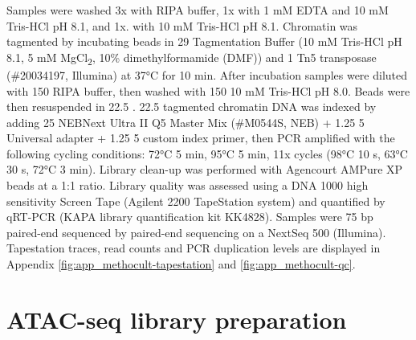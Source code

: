 Samples were washed 3x with RIPA buffer, 1x with 1 mM EDTA and 10 mM Tris-HCl pH 8.1, and 1x. with 10 mM Tris-HCl pH 8.1. Chromatin was tagmented by incubating beads in 29 \microl{} Tagmentation Buffer (10 mM Tris-HCl pH 8.1, 5 mM MgCl\textsubscript{2}, 10\% dimethylformamide (DMF)) and 1 \microl{} Tn5 transposase (\#20034197, Illumina) at 37°C for 10 min. After incubation samples were diluted with 150 \microl{} RIPA buffer, then washed with 150 \microl{} 10 mM Tris-HCl pH 8.0. Beads were then resuspended in 22.5 \microl{} \water{}. 22.5 \microl{} tagmented chromatin DNA was indexed by adding 25 \microl{} NEBNext Ultra II Q5 Master Mix (\#M0544S, NEB) + 1.25 \microl{} 5 \microm{} Universal adapter + 1.25 \microl{} 5 \microm{} custom index primer, then PCR amplified with the following cycling conditions: 72°C 5 min, 95°C 5 min, 11x cycles (98°C 10 s, 63°C 30 s, 72°C 3 min). Library clean-up was performed with Agencourt AMPure XP beads at a 1:1 ratio. Library quality was assessed using a DNA 1000 high sensitivity Screen Tape (Agilent 2200 TapeStation system) and quantified by qRT-PCR (KAPA library quantification kit KK4828). Samples were 75 bp paired-end sequenced by paired-end sequencing on a NextSeq 500 (Illumina). Tapestation traces, read counts and PCR duplication levels are displayed in Appendix \ref{fig:app_methocult-tapestation} and \ref{fig:app_methocult-qc}.

\section{\label{ch2:atac}ATAC-seq library preparation}

